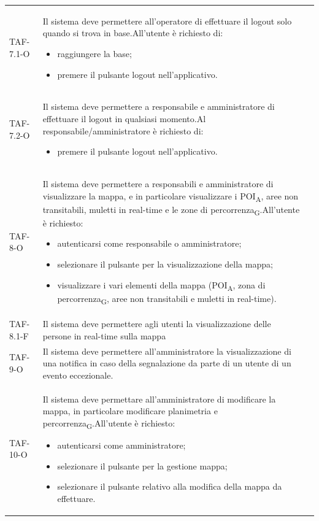 \begin{longtable}{ >{\centering}p{} >{}p{}
		>{\centering}p{}}
	TAF-7.1-O & Il sistema deve permettere all'operatore di effettuare il logout solo quando si trova in base.\newline All'utente è richiesto di: \begin{itemize} \item raggiungere la base; \item premere il pulsante logout nell'applicativo. \end{itemize} & 0\tabularnewline
	
	TAF-7.2-O & Il sistema deve permettere a responsabile e amministratore di effettuare il logout in qualsiasi momento.\newline Al responsabile/amministratore è richiesto di: \begin{itemize} \item premere il pulsante logout nell'applicativo. \end{itemize} & 0\tabularnewline
	
	TAF-8-O & Il sistema deve permettere a responsabili e amministratore di visualizzare la mappa, e in particolare visualizzare i \acrshort{POI}\textsubscript{A}, aree non transitabili, muletti in real-time e le zone di \gls{percorrenza}\textsubscript{G}.\newline All'utente è richiesto:\begin{itemize} \item autenticarsi come responsabile o amministratore; \item selezionare il pulsante per la visualizzazione della mappa; \item visualizzare i vari elementi della mappa (\acrshort{POI}\textsubscript{A}, zona di \gls{percorrenza}\textsubscript{G}, aree non transitabili e muletti in real-time). \end{itemize} & 0\tabularnewline
	
	TAF-8.1-F & Il sistema deve permettere agli utenti la visualizzazione delle persone in real-time sulla mappa & 0\tabularnewline
	
	TAF-9-O & Il sistema deve permettere all'amministratore la visualizzazione di una notifica in caso della segnalazione da parte di un utente di un evento eccezionale. & 0\tabularnewline
	
	TAF-10-O & Il sistema deve permettare all'amministratore di modificare la mappa, in particolare modificare planimetria e \gls{percorrenza}\textsubscript{G}.\newline All'utente è richiesto: \begin{itemize} \item autenticarsi come amministratore; \item selezionare il pulsante per la gestione mappa; \item selezionare il pulsante relativo alla modifica della mappa da effettuare.\end{itemize} & 0\tabularnewline
	

\end{longtable}
